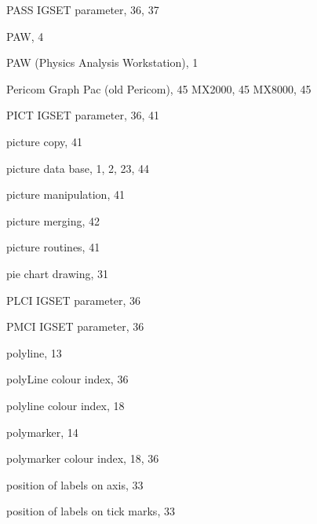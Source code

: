 \begin{theindex}
  \item PASS
    \subitem IGSET parameter, 36, 37
  \item PAW, 4
  \item PAW (Physics Analysis Workstation), 1
  \item Pericom
    \subitem Graph Pac (old Pericom), 45
    \subitem MX2000, 45
    \subitem MX8000, 45
  \item PICT
    \subitem IGSET parameter, 36, 41
  \item picture copy, 41
  \item picture data base, 1, 2, 23, 44
  \item picture manipulation, 41
  \item picture merging, 42
  \item picture routines, 41
  \item pie chart drawing, 31
  \item PLCI
    \subitem IGSET parameter, 36
  \item PMCI
    \subitem IGSET parameter, 36
  \item polyline, 13
  \item polyLine colour index, 36
  \item polyline colour index, 18
  \item polymarker, 14
  \item polymarker colour index, 18, 36
  \item position of labels on axis, 33
  \item position of labels on tick marks, 33
 
  \indexspace
 

\end{theindex}
